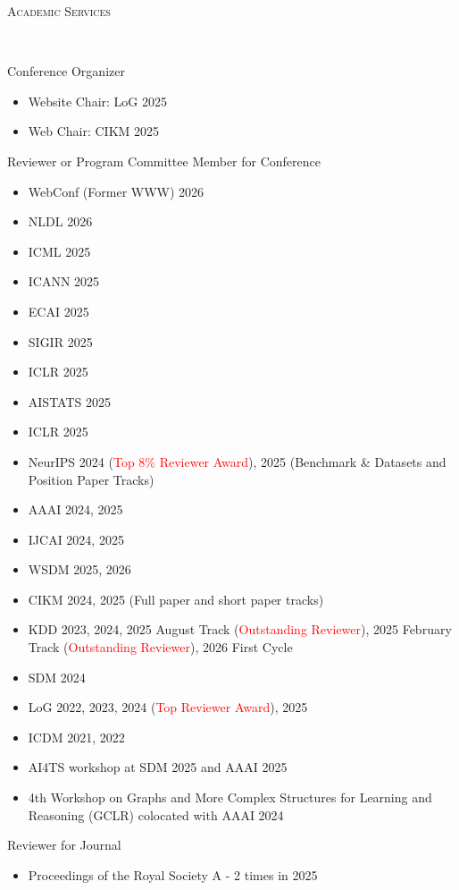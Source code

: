 \documentclass[10pt]{article}
\newenvironment{changemargin}[2]{
  \begin{list}{}{
    \setlength{\topsep}{0pt}
    \setlength{\leftmargin}{#1}
    \setlength{\rightmargin}{#2}
    \setlength{\listparindent}{\parindent}
    \setlength{\itemindent}{\parindent}
    \setlength{\parsep}{\parskip}
  }
  \item[]}{\end{list}
}
\newcommand{\lineover}{
	\begin{changemargin}{-0.05in}{-0.05in}
		\vspace*{-8pt}
		\hrulefill \\
		\vspace*{-2pt}
	\end{changemargin}
}
\newcommand{\header}[1]{
	\begin{changemargin}{-0.5in}{-0.5in}
		\scshape{#1}\\
  	\lineover
	\end{changemargin}
}
\newcommand{\RED}[1]{\textcolor{red}{#1}}
\newenvironment{body} {
	\vspace*{-16pt}
	\begin{changemargin}{-0.25in}{-0.5in}
  }
	{\end{changemargin}
}
\begin{document}
\medskip

\header{Academic Services}

\begin{body}
	\vspace{14pt}
    Conference Organizer
    \begin{itemize}
        \item Website Chair: LoG 2025
        \item Web Chair: CIKM 2025
    \end{itemize}
   Reviewer or Program Committee Member for Conference
    \begin{itemize}
        \item WebConf (Former WWW) 2026
        \item NLDL 2026
        \item ICML 2025
        \item ICANN 2025
        \item ECAI 2025
        \item SIGIR 2025
        \item ICLR 2025
        \item AISTATS 2025
        \item ICLR 2025
        \item NeurIPS 2024 (\RED{Top 8\% Reviewer Award}), 2025 (Benchmark \& Datasets and Position Paper Tracks)
        \item AAAI 2024, 2025
        \item IJCAI 2024, 2025
        \item WSDM 2025, 2026
        \item CIKM 2024, 2025 (Full paper and short paper tracks)
        \item KDD 2023, 2024, 2025 August Track (\RED{Outstanding Reviewer}), 2025 February Track (\RED{Outstanding Reviewer}), 2026 First Cycle
        \item SDM 2024
        \item LoG 2022, 2023, 2024 (\RED{Top Reviewer Award}), 2025
        \item ICDM 2021, 2022
        \item AI4TS workshop at SDM 2025 and AAAI 2025
        \item 4th Workshop on Graphs and More Complex Structures for Learning and Reasoning (GCLR) colocated with AAAI 2024
    \end{itemize}
    Reviewer for Journal
    \begin{itemize}
        \item Proceedings of the Royal Society A - 2 times in 2025

\end{itemize}
\end{body}
\end{document}
